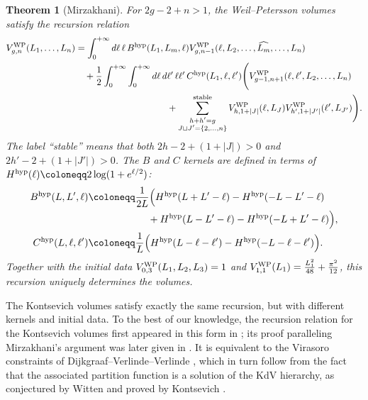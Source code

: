 \documentclass[a4paper,11pt,english]{article}
\theoremstyle{plain}
\newtheorem{theorem}{Theorem}[section]
\theoremstyle{definition}
\theoremstyle{plain}
\begin{document}
\begin{theorem}[Mirzakhani]\label{thm:Mir}
    For $2g-2+n > 1$, the Weil--Petersson volumes satisfy the recursion relation
	\begin{equation}
    \begin{split}
    	V^{\textup{WP}}_{g,n}(L_1,\ldots,L_n)
    	&=
    	\int_{0}^{+\infty}
    		d\ell \,
    		  \ell \, B^{\textup{hyp}}(L_1,L_m,\ell)
    		  V^{\textup{WP}}_{g,n-1}(\ell,L_2,\dots, \widehat{L_m},\dots, L_n) \\
    	& \quad
    	+ \frac{1}{2} \int_{0}^{+\infty} \int_{0}^{+\infty}
    		d\ell \, d\ell' \,
    		\ell \ell' \, C^{\textup{hyp}}(L_1,\ell,\ell') \Bigg(
    			V^{\textup{WP}}_{g-1,n+1}(\ell,\ell',L_2,\dots,L_n) \\
    	& \qquad\qquad\qquad\qquad\qquad
    			+
    			\sum_{\substack{ h + h' = g \\ J \sqcup J' = \{2,\dots,n\} }}^{\textup{stable}}
    				V^{\textup{WP}}_{h,1+|J|}(\ell,L_{J})
    				V^{\textup{WP}}_{h',1+|J'|}(\ell',L_{J'})
    	\Bigg).
    \end{split}
    \end{equation}
    The label ``stable'' means that both $2h-2+(1+|J|)>0$ and $2h'-2+(1+|J'|)>0$. The $B$ and $C$ kernels are defined in terms of $H^{\textup{hyp}}(\ell) \coloneqq 2 \log(1 + e^{\ell/2})$:
    \begin{equation}
    \begin{aligned}
    	B^{\textup{hyp}}(L,L',\ell)
    	& \coloneqq
    	\frac{1}{2L} \Bigl(
    		H^{\textup{hyp}}(L + L' - \ell)
    		-
    		H^{\textup{hyp}}(-L - L' - \ell) \\
    		& \qquad\qquad\qquad
    		+
    		H^{\textup{hyp}}(L - L' - \ell)
    		-
    		H^{\textup{hyp}}(-L + L' - \ell)
    	\Bigr), \\
    	C^{\textup{hyp}}(L,\ell,\ell')
    	& \coloneqq
    	\frac{1}{L} \Bigl(
    		H^{\textup{hyp}}(L - \ell - \ell')
    		-
    		H^{\textup{hyp}}(-L - \ell - \ell')
    	\Bigr).
    \end{aligned}
    \end{equation}
    Together with the initial data $V^{\textup{WP}}_{0,3}(L_1,L_2,L_3) = 1$ and $V^{\textup{WP}}_{1,1}(L_1) = \frac{L_1^2}{48} + \frac{\pi^2}{12}$, this recursion uniquely determines the volumes.
\end{theorem}

The Kontsevich volumes satisfy exactly the same recursion, but with different kernels and initial data. To the best of our knowledge, the recursion relation for the Kontsevich volumes first appeared in this form in \cite{BCSW12}; its proof paralleling Mirzakhani's argument was later given in \cite{ABCGLW}. It is equivalent to the Virasoro constraints of Dijkgraaf--Verlinde--Verlinde \cite{DVV91}, which in turn follow from the fact that the associated partition function is a solution of the KdV hierarchy, as conjectured by Witten and proved by Kontsevich \cite{Wit91,Kon92}.
\end{document}
